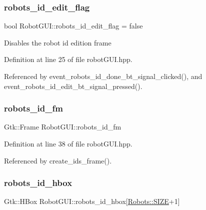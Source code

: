 \subsubsection{\texorpdfstring{robots\+\_\+id\+\_\+edit\+\_\+flag}{robots\_id\_edit\_flag}}
{\footnotesize\ttfamily bool Robot\+G\+U\+I\+::robots\+\_\+id\+\_\+edit\+\_\+flag = false\hspace{0.3cm}{\ttfamily [private]}}

Disables the robot id edition frame 

Definition at line 25 of file robot\+G\+U\+I.\+hpp.



Referenced by event\+\_\+robots\+\_\+id\+\_\+done\+\_\+bt\+\_\+signal\+\_\+clicked(), and event\+\_\+robots\+\_\+id\+\_\+edit\+\_\+bt\+\_\+signal\+\_\+pressed().

\mbox{\label{class_robot_g_u_i_a64bb163eaa38fd00aee4db7428d3aae7}} 
\subsubsection{\texorpdfstring{robots\+\_\+id\+\_\+fm}{robots\_id\_fm}}
{\footnotesize\ttfamily Gtk\+::\+Frame Robot\+G\+U\+I\+::robots\+\_\+id\+\_\+fm\hspace{0.3cm}{\ttfamily [private]}}



Definition at line 38 of file robot\+G\+U\+I.\+hpp.



Referenced by create\+\_\+ids\+\_\+frame().

\mbox{\label{class_robot_g_u_i_a9cbad34535e54602bf18610c56e003a8}} 
\subsubsection{\texorpdfstring{robots\+\_\+id\+\_\+hbox}{robots\_id\_hbox}}
{\footnotesize\ttfamily Gtk\+::\+H\+Box Robot\+G\+U\+I\+::robots\+\_\+id\+\_\+hbox\mbox{[}\hyperlink{class_robots_ae9df2f1d345ad6740f0459956cdd4712}{Robots\+::\+S\+I\+ZE}+1\mbox{]}\hspace{0.3cm}{\ttfamily [private]}}


